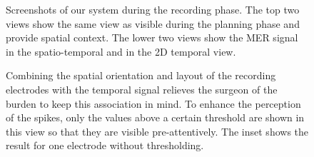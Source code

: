 \documentclass{egpubl}
\begin{document}
\begin{figure}[t]
  \centering
  \caption{Screenshots of our system during the recording phase. The top two views show the same view as visible during the planning phase and provide spatial context. The lower two views show the MER signal in the spatio-temporal and in the 2D temporal view.}
  \label{fig:screenshot}
\end{figure}

\begin{figure}[t]
    \centering
    \caption{Combining the spatial orientation and layout of the recording electrodes with the temporal signal relieves the surgeon of the burden to keep this association in mind. To enhance the perception of the spikes, only the values above a certain threshold are shown in this view so that they are visible pre-attentively. The inset shows the result for one electrode without thresholding.}
    \label{fig:recordingphase:3dsound}
\end{figure}
\end{document}
